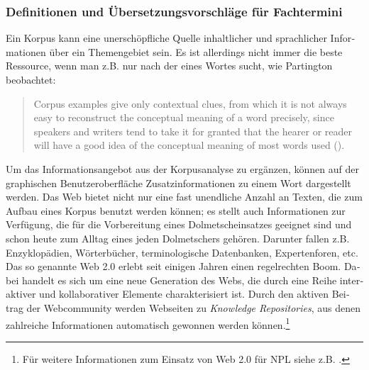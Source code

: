 \documentclass[output=paper]{LSP/langsci}
\begin{document}
\begin{otherlanguage}{ngerman}
\subsubsection{Definitionen und Übersetzungsvorschläge für Fachtermini}\label{sec:fantinuoli:6.1.4}

Ein Korpus kann eine unerschöpfliche Quelle inhaltlicher und sprachlicher Informationen über ein Themengebiet sein. Es ist allerdings nicht immer die beste Ressource, wenn man z.B. nur nach der  eines Wortes sucht, wie Partington beobachtet:

\begin{quote}
Corpus examples give only contextual clues, from which it is not always easy to reconstruct the conceptual meaning of a word precisely, since speakers and writers tend to take it for granted that the hearer or reader will have a good idea of the conceptual meaning of most words used (\citeyear[64]{Partington2001}).
\end{quote}

Um das Informationsangebot aus der Korpusanalyse zu ergänzen, können auf der graphischen Benutzeroberfläche Zusatzinformationen zu einem Wort dargestellt werden. Das Web bietet nicht nur eine fast unendliche Anzahl an Texten, die zum Aufbau eines Korpus benutzt werden können; es stellt auch Informationen zur Verfügung, die für die Vorbereitung eines Dolmetscheinsatzes geeignet sind und schon heute zum Alltag eines jeden Dolmetschers gehören. Darunter fallen z.B. Enzyklopädien, Wörterbücher, terminologische Datenbanken, Expertenforen, etc. Das so genannte Web 2.0 erlebt seit einigen Jahren einen regelrechten Boom. Dabei handelt es sich um eine neue Generation des Webs, die durch eine Reihe interaktiver und kollaborativer Elemente charakterisiert ist. Durch den aktiven Beitrag der Webcommunity werden Webseiten zu \textit{Knowledge Repositories}, aus denen zahlreiche Informationen automatisch gewonnen werden können.\footnote{Für weitere Informationen zum Einsatz von Web 2.0 für NPL siehe z.B. \citep{Frank2008}.}


\end{otherlanguage}
\end{document}
